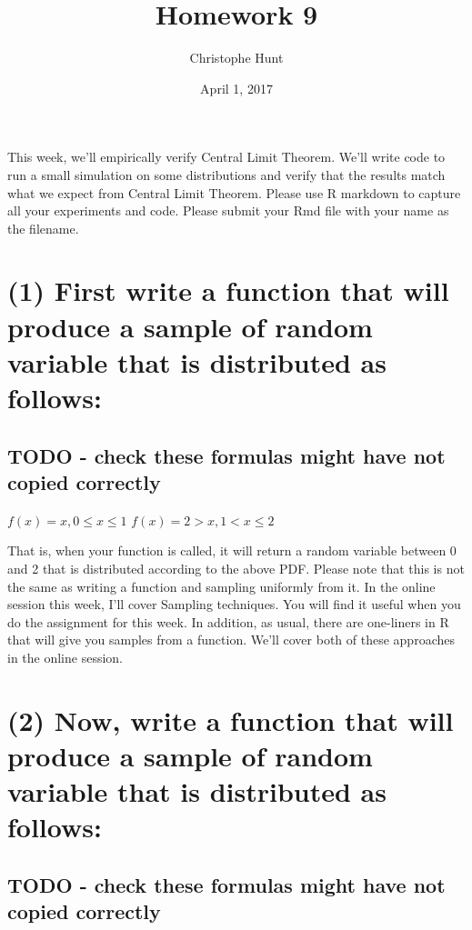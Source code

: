\documentclass[]{article}
\title{Homework 9}
\author{Christophe Hunt}
\date{April 1, 2017}
\begin{document}
\maketitle

{
\setcounter{tocdepth}{2}
\tableofcontents
}
This week, we'll empirically verify Central Limit Theorem. We'll write
code to run a small simulation on some distributions and verify that the
results match what we expect from Central Limit Theorem. Please use R
markdown to capture all your experiments and code. Please submit your
Rmd file with your name as the filename.

\section{(1) First write a function that will produce a sample of random
variable that is distributed as
follows:}\label{first-write-a-function-that-will-produce-a-sample-of-random-variable-that-is-distributed-as-follows}

\subsection{TODO - check these formulas might have not copied
correctly}\label{todo---check-these-formulas-might-have-not-copied-correctly}

\(f(x) = x, 0 \leq x \leq 1\) \(f(x) = 2 > x, 1 < x \leq 2\)

That is, when your function is called, it will return a random variable
between 0 and 2 that is distributed according to the above PDF. Please
note that this is not the same as writing a function and sampling
uniformly from it. In the online session this week, I'll cover Sampling
techniques. You will find it useful when you do the assignment for this
week. In addition, as usual, there are one-liners in R that will give
you samples from a function. We'll cover both of these approaches in the
online session.

\section{(2) Now, write a function that will produce a sample of random
variable that is distributed as
follows:}\label{now-write-a-function-that-will-produce-a-sample-of-random-variable-that-is-distributed-as-follows}

\subsection{TODO - check these formulas might have not copied
correctly}\label{todo---check-these-formulas-might-have-not-copied-correctly-1}
\end{document}
